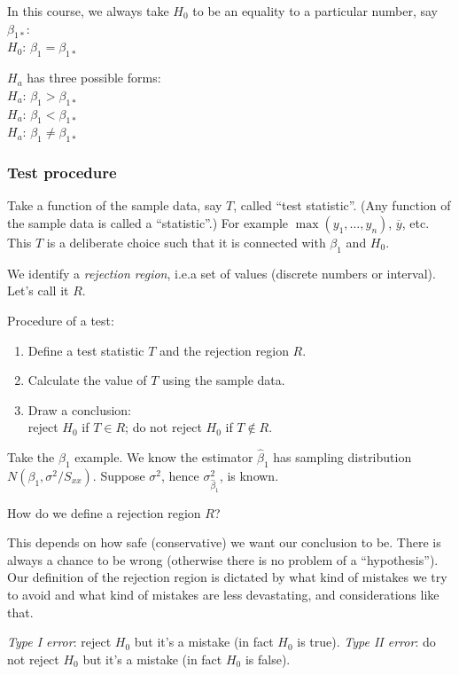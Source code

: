 \documentclass[12pt]{article}
\begin{document}
In this course, we always take $H_0$ to be an equality to
a particular number, say $\beta_{1*}$:\\
$H_0$: $\beta_1 = \beta_{1*}$

$H_a$ has three possible forms:\\
$H_a$: $\beta_1 > \beta_{1*}$\\
$H_a$: $\beta_1 < \beta_{1*}$\\
$H_a$: $\beta_1 \ne \beta_{1*}$


\subsubsection{Test procedure}

Take a function of the sample data, say $T$, called ``test statistic''.
(Any function of the sample data is called a ``statistic''.)
For example $\max(y_1,\dotsc,y_n)$, $\overline{y}$, etc.
This $T$ is a deliberate choice such that it is connected with $\beta_1$
and $H_0$.

We identify a \emph{rejection region}, i.e.\@ a set of values
(discrete numbers or interval). Let's call it $R$.

Procedure of a test:
\begin{enumerate}
\item Define a test statistic $T$ and the rejection region $R$.
\item Calculate the value of $T$ using the sample data.
\item Draw a conclusion:\\
reject $H_0$ if $T \in R$; do not reject $H_0$ if $T \notin R$.
\end{enumerate}

Take the $\beta_1$ example.
We know the estimator $\hat\beta_1$ has sampling distribution
$N(\beta_1, \sigma^2/S_{xx})$.
Suppose $\sigma^2$, hence $\sigma^2_{\hat\beta_1}$, is known.

How do we define a rejection region $R$?

This depends on how safe (conservative) we want our conclusion to be.
There is always a chance to be wrong (otherwise there is no problem of a
``hypothesis'').
Our definition of the rejection region is dictated by
what kind of mistakes we try to avoid and
what kind of mistakes are less devastating,
and considerations like that.


%
\emph{Type I error}:
reject $H_0$ but it's a mistake (in fact $H_0$ is true).
\emph{Type II error}:
do not reject $H_0$ but it's a mistake (in fact $H_0$ is false).
\end{document}
